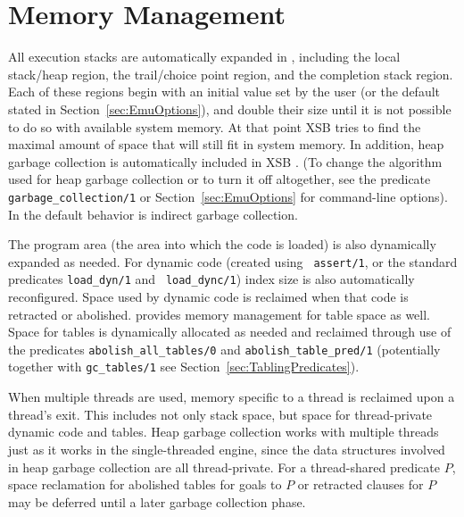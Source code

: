 
\section{Memory Management}\label{memory_management}
All execution stacks are automatically expanded in \version{},
including the local stack/heap region, the trail/choice point region,
and the completion stack region.  Each of these regions begin with an
initial value set by the user (or the default stated in
Section~\ref{sec:EmuOptions}), and double their size until it is not
possible to do so with available system memory.  At that point XSB
tries to find the maximal amount of space that will still fit in
system memory.  In addition, heap garbage collection is automatically
included in XSB \cite{CaSC01,CATmem@ISMM-98}.  (To change the
algorithm used for heap garbage collection or to turn it off
altogether, see the predicate {\tt garbage\_collection/1} or
Section~\ref{sec:EmuOptions} for command-line options).  In \version{}
the default behavior is indirect garbage collection.

The program area (the area into which the code is loaded) is also
dynamically expanded as needed.  For dynamic code (created using {\tt
assert/1}, or the standard predicates {\tt load\_dyn/1} and {\tt
load\_dync/1}) index size is also automatically reconfigured.  Space
used by dynamic code is reclaimed when that code is retracted or
abolished.  \version{} provides memory management for table space as
well.  Space for tables is dynamically allocated as needed and
reclaimed through use of the predicates {\tt abolish\_all\_tables/0}
and {\tt abolish\_table\_pred/1} 
(potentially together with {\tt gc\_tables/1} see
Section~\ref{sec:TablingPredicates}). 

When multiple threads are used, memory specific to a thread is
reclaimed upon a thread's exit.  This includes not only stack space,
but space for thread-private dynamic code and tables.  Heap garbage
collection works with multiple threads just as it works in the
single-threaded engine, since the data structures involved in heap
garbage collection are all thread-private.  For a thread-shared
predicate $P$, space reclamation for abolished tables for goals to $P$
or retracted clauses for $P$ may be deferred until a later garbage
collection phase.

